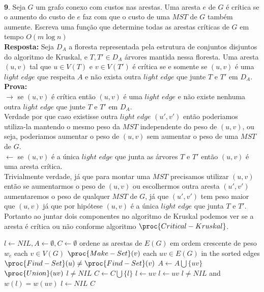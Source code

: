 \\[6pt]
\noindent \textbf{9}. Seja $G$ um grafo conexo com custos nas arestas. Uma aresta $e$ de $G$ é crítica se o aumento do custo de $e$ faz com que o custo de uma $MST$ de $G$ também aumente. Escreva uma função que determine todas as arestas críticas de $G$ em tempo $O(m \log n)$
\\[6pt]
\noindent \textbf{Resposta:} Seja $D_A$ a floresta representada pela estrutura de conjuntos disjuntos do algoritmo de Kruskal, e $T, T' \in D_A$ árvores mantida nessa floresta. Uma aresta $(u,v)$ tal que $u \in V(T)$ e $v \in V(T')$ é crítica se e somente se $(u,v)$ é uma $light$ $edge$ que respeita $A$ e não exista outra $light$ $edge$ que junte $T$ e $T'$ em $D_A$.
\\[6pt]
\noindent \textbf{Prova:}
\\[6pt]
\noindent $\rightarrow$ se $(u,v)$ é crítica então $(u,v)$ é uma $light$ $edge$ e não existe nenhuma outra $light$ $edge$ que junte $T$ e $T'$ em $D_A$.
\\[6pt] 
\noindent Verdade por que caso existisse outra $light$ $edge$ $(u',v')$ então poderiamos utiliza-la mantendo o mesmo peso da $MST$ independente do peso de $(u,v)$, ou seja, poderiamos aumentar o peso de $(u,v)$ sem aumentar o peso de uma $MST$ de $G$.
\\[6pt]
\noindent $\leftarrow$ se $(u,v)$ é a única $light$ $edge$ que junta as árvores $T$ e $T'$ então $(u,v)$ é uma aresta crítica.
\\[6pt]
\noindent Trivialmente verdade, já que para montar uma $MST$ precisamos utilizar $(u,v)$ então se aumentarmos o peso de $(u,v)$ ou escolhermos outra aresta $(u', v')$ aumentaremos o peso de qualquer $MST$ de $G$, já que $(u', v')$ tem peso maior que $(u, v)$ já que por hipótese $(u,v)$ é a única $light$ $edge$ que junta $T$ e $T'$.
\\[6pt]
\noindent Portanto ao juntar dois componentes no algoritmo de Kruskal podemos ver se a aresta é crítica ou não conforme algoritmo $\proc{Critical-Kruskal}$.

\begin{codebox}
 \li $l \gets NIL, A \gets \emptyset, C \gets \emptyset$
 \li ordene as arestas de $E(G)$ em ordem crescente de peso $w_e$
 \li \For each $v \in V(G)$
 \li \Do
	$\proc{Make-Set}(v)$
      \End
 \li \For each $uv \in E(G)$ in the sorted edges
 \li \Do
 	\If $\proc{Find-Set}(u) \neq \proc{Find-Set}(v)$
 \li	\Then
 	    $A \gets A \bigcup \{uv\}$
 \li	    $\proc{Union}(uv)$
 \li	    \If $l \neq NIL$
 \li	    \Then
 	       $C \gets C \bigcup \{l\}$
 	    \End
 \li	    $l \gets uv$
 \li	    $l \gets uv$
 	 \Else
 \li	    \If $l \neq NIL$ and $w(l) = w(uv)$
 \li	    \Then
 	      $l \gets NIL$
 	    \End
         \End
     \End 
 \li \Return $C$
\end{codebox}

